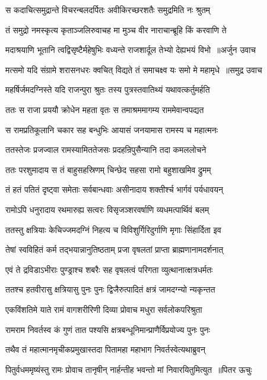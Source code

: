 \twolineshloka
{स कदाचित्समुद्रान्ते विचरन्बलदर्पितः}
{अवीकिरच्छरशतैः समुद्रमिति नः श्रुतम्}


\twolineshloka
{तं समुद्रो नमस्कृत्य कृताञ्जलिरुवाचह}
{मा मुञ्च वीर नाराचान्ब्रूहि किं करवाणि ते}


\threelineshloka
{मदाश्रयाणि भूतानि त्वद्विसृष्टैर्महेषुभिः}
{वध्यन्ते राजशार्दूल तेभ्यो देह्यभयं विभो ॥अर्जुन उवाच}
{}


\threelineshloka
{मत्समो यदि संग्रामे शरासनधरः क्वचित्}
{विद्यते तं समाचक्ष्व यः समो मे महामृधे ॥समुद्र उवाच}
{}


\twolineshloka
{महर्षिर्जमदग्निस्ते यदि राजन्पुरा श्रुतः}
{तस्य पुत्रस्तवातिथ्यं यथावत्कर्तुमर्हति}


\twolineshloka
{ततः स राजा प्रययौ क्रोधेन महता वृतः}
{स तमाश्रममागम्य राममेवान्वपद्यत}


\twolineshloka
{स रामप्रतिकूलानि चकार सह बन्धुभिः}
{आयासं जनयामास रामस्य च महात्मनः}


\twolineshloka
{ततस्तेजः प्रजज्वाल रामस्यामिततेजसः}
{प्रदहन्रिपुसैन्यानि तदा कमललोचने}


\twolineshloka
{ततः परशुमादाय स तं बाहुसहस्रिणम्}
{चिन्छेद सहसा रामो बहुशाखमिव द्रुमम्}


\twolineshloka
{तं हतं पतितं दृष्ट्वा समेताः सर्वबान्धवाः}
{असीनादाय शक्तीर्श्च भार्गवं पर्यधावयन्}


\twolineshloka
{रामोऽपि धनुरादाय रथमारुह्य सत्वरः}
{विसृजञ्शरवर्षाणि व्यधमत्पार्थिवं बलम्}


\twolineshloka
{ततस्तु क्षत्रियाः केचिज्जमदग्निं निहत्य च}
{विविशुर्गिरिदुर्गाणि मृगाः सिंहार्दिता इव}


\twolineshloka
{तेषां स्वविहितं कर्म तद्भयान्नानुतिष्ठताम्}
{प्रजा वृषलतां प्राप्ता ब्राह्मणानामदर्शनात्}


\twolineshloka
{एवं ते द्रविडाऽभीराः पुण्ड्राश्च शबरैः सह}
{वृषलत्वं परिगता व्युत्थानात्क्षत्रधर्मतः}


\twolineshloka
{ततश्च हतवीरासु क्षत्रियासु पुनः पुनः}
{द्विजैरुत्पादितं क्षत्रं जामदग्न्यो न्यकृन्तत}


\twolineshloka
{एकविंशतिमे याते रामं वागशरीरिणी}
{दिव्या प्रोवाच मधुरा सर्वलोकपरिश्रुता}


\twolineshloka
{रामराम निवर्तस्व कं गुणं तात पश्यसि}
{क्षत्रबन्धूनिमान्प्राणैर्विप्रयोज्य पुनः पुनः}


\twolineshloka
{तथैव तं महात्मानमृचीकप्रमुखास्तदा}
{पितामहा महाभाग निवर्तस्वेत्यथाब्रुवन्}


\threelineshloka
{पितुर्वधममृष्यंस्तु रामः प्रोवाच तानृषीन्}
{नार्हन्तीह भवन्तो मां निवारयितुमित्युत ॥पितर ऊचुः}
{}


